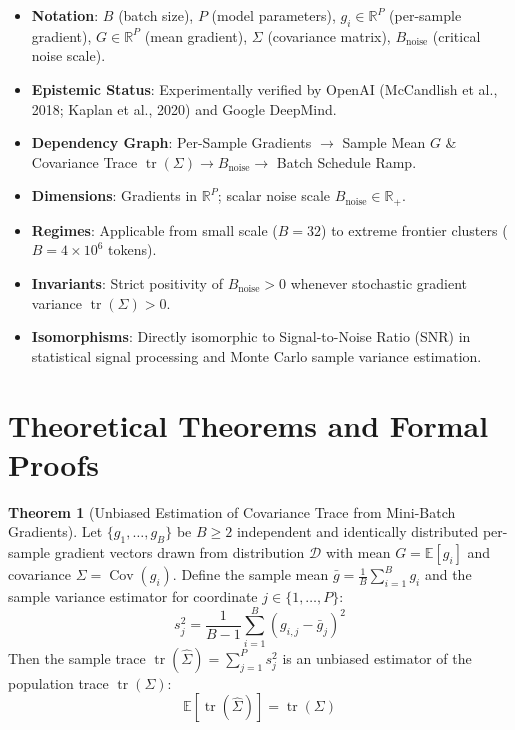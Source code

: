 \documentclass[11pt,a4paper]{article}
\theoremstyle{definition}
\newtheorem{theorem}{\textbf{Theorem}}[section]
\begin{document}
\begin{itemize}
    \item \textbf{Notation}: $B$ (batch size), $P$ (model parameters), $g_i \in \mathbb{R}^P$ (per-sample gradient), $G \in \mathbb{R}^P$ (mean gradient), $\Sigma$ (covariance matrix), $B_{\text{noise}}$ (critical noise scale).
    \item \textbf{Epistemic Status}: Experimentally verified by OpenAI (McCandlish et al., 2018; Kaplan et al., 2020) and Google DeepMind.
    \item \textbf{Dependency Graph}: Per-Sample Gradients $\to$ Sample Mean $G$ \& Covariance Trace $\operatorname{tr}(\Sigma) \to B_{\text{noise}} \to$ Batch Schedule Ramp.
    \item \textbf{Dimensions}: Gradients in $\mathbb{R}^P$; scalar noise scale $B_{\text{noise}} \in \mathbb{R}_+$.
    \item \textbf{Regimes}: Applicable from small scale ($B=32$) to extreme frontier clusters ($B = 4\times 10^6$ tokens).
    \item \textbf{Invariants}: Strict positivity of $B_{\text{noise}} > 0$ whenever stochastic gradient variance $\operatorname{tr}(\Sigma) > 0$.
    \item \textbf{Isomorphisms}: Directly isomorphic to Signal-to-Noise Ratio (SNR) in statistical signal processing and Monte Carlo sample variance estimation.
\end{itemize}

\section{Theoretical Theorems and Formal Proofs}

\begin{theorem}[Unbiased Estimation of Covariance Trace from Mini-Batch Gradients]
Let $\{g_1, \dots, g_B\}$ be $B \ge 2$ independent and identically distributed per-sample gradient vectors drawn from distribution $\mathcal{D}$ with mean $G = \mathbb{E}[g_i]$ and covariance $\Sigma = \operatorname{Cov}(g_i)$. Define the sample mean $\bar{g} = \frac{1}{B} \sum_{i=1}^B g_i$ and the sample variance estimator for coordinate $j \in \{1, \dots, P\}$:
\begin{equation}
s_j^2 = \frac{1}{B - 1} \sum_{i=1}^B \left( g_{i, j} - \bar{g}_j \right)^2
\end{equation}
Then the sample trace $\operatorname{tr}(\hat{\Sigma}) = \sum_{j=1}^P s_j^2$ is an unbiased estimator of the population trace $\operatorname{tr}(\Sigma)$:
{\boldmath
\begin{equation}
\mathbb{E}\left[ \operatorname{tr}(\hat{\Sigma}) \right] = \operatorname{tr}(\Sigma)
\end{equation}
}
\end{theorem}
\end{document}
